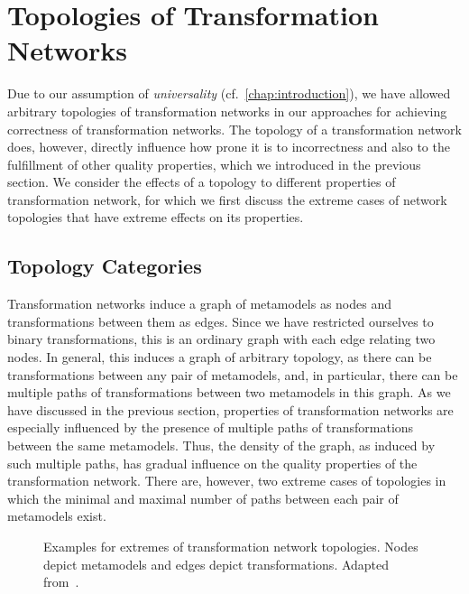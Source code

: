 \section{Topologies of Transformation Networks}
\label{chap:classification:topologies}

Due to our assumption of \emph{universality} (cf.\ \autoref{chap:introduction}), we have allowed arbitrary topologies of transformation networks in our approaches for achieving correctness of transformation networks.
The topology of a transformation network does, however, directly influence how prone it is to incorrectness and also to the fulfillment of other quality properties, which we introduced in the previous section.
We consider the effects of a topology to different properties of transformation network, for which we first discuss the extreme cases of network topologies that have extreme effects on its properties.


\subsection{Topology Categories}

Transformation networks induce a graph of metamodels as nodes and transformations between them as edges.
Since we have restricted ourselves to binary transformations, this is an ordinary graph with each edge relating two nodes.
In general, this induces a graph of arbitrary topology, as there can be transformations between any pair of metamodels, and, in particular, there can be multiple paths of transformations between two metamodels in this graph.
As we have discussed in the previous section, properties of transformation networks are especially influenced by the presence of multiple paths of transformations between the same metamodels.
Thus, the density of the graph, as induced by such multiple paths, has gradual influence on the quality properties of the transformation network.
There are, however, two extreme cases of topologies in which the minimal and maximal number of paths between each pair of metamodels exist.

\begin{figure}
    \centering
    \begin{minipage}[b]{0.49\columnwidth}
        \centering
        
        \label{fig:classification:topologies:complete}
    \end{minipage}
    \hfill
    \begin{minipage}[b]{0.49\columnwidth}
        \centering
        
        \vspace{1em}
        \label{fig:classification:topologies:tree}
    \end{minipage}
    \caption[Extremes of transformation network topologies]{Examples for extremes of transformation network topologies. Nodes depict metamodels and edges depict transformations. Adapted from~.}
    \label{fig:classification:topologies}
\end{figure}

